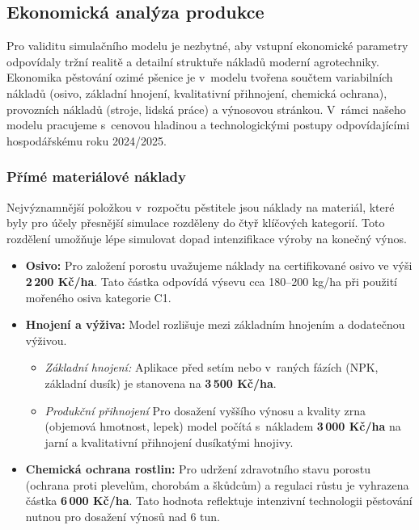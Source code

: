 \documentclass[11pt,a4paper]{article}
\begin{document}
\subsection{Ekonomická analýza produkce}\label{sec:ekonomika}

Pro validitu simulačního modelu je nezbytné, aby vstupní ekonomické parametry odpovídaly tržní realitě a detailní struktuře nákladů moderní agrotechniky. Ekonomika pěstování ozimé pšenice je v~modelu tvořena součtem variabilních nákladů (osivo, základní hnojení, kvalitativní přihnojení, chemická ochrana), provozních nákladů (stroje, lidská práce) a výnosovou stránkou. V~rámci našeho modelu pracujeme s~cenovou hladinou a technologickými postupy odpovídajícími hospodářskému roku 2024/2025.

\subsubsection{Přímé materiálové náklady}\label{materialove-naklady}

Nejvýznamnější položkou v~rozpočtu pěstitele jsou náklady na materiál, které byly pro účely přesnější simulace rozděleny do čtyř klíčových kategorií. Toto rozdělení umožňuje lépe simulovat dopad intenzifikace výroby na konečný výnos.

\begin{itemize}
    \item \textbf{Osivo:} Pro založení porostu uvažujeme náklady na certifikované osivo ve výši \textbf{2\,200 Kč/ha}. Tato částka odpovídá výsevu cca 180--200 kg/ha při použití mořeného osiva kategorie C1\cite{agromanuál-ceny-osiv}.
    
    \item \textbf{Hnojení a výživa:} Model rozlišuje mezi základním hnojením a dodatečnou výživou. 
    \begin{itemize}
        \item \textit{Základní hnojení:} Aplikace před setím nebo v~raných fázích (NPK, základní dusík) je stanovena na \textbf{3\,500 Kč/ha}\cite{agromanuál-hnojiva-2024}.
        \item \textit{Produkční přihnojení} Pro dosažení vyššího výnosu a kvality zrna (objemová hmotnost, lepek) model počítá s~nákladem \textbf{3\,000 Kč/ha} na jarní a kvalitativní přihnojení dusíkatými hnojivy.
    \end{itemize}

    \item \textbf{Chemická ochrana rostlin:} Pro udržení zdravotního stavu porostu (ochrana proti plevelům, chorobám a škůdcům) a regulaci růstu je vyhrazena částka \textbf{6\,000 Kč/ha}\cite{úze-nákladovost-pšenice}. Tato hodnota reflektuje intenzivní technologii pěstování nutnou pro dosažení výnosů nad 6 tun.
\end{itemize}
\end{document}
